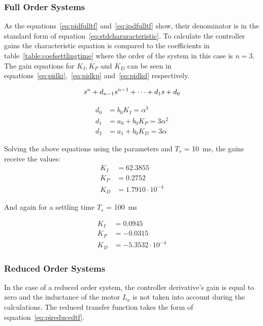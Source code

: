 \subsubsection{Full Order Systems}

As the equations~\ref{eq:pidfulltf} and~\ref{eq:ipdfulltf} show, their denominator is in the standard form of equation~\ref{eq:stdchararacteristic}. To calculate the controller gains the characteristic equation is compared to the coefficients in table~\ref{table:coefsettlingtime} where the order of the system in this case is $n=3$. The gain equations for $K_I, K_P$ and $K_D$ can be seen in equations~\ref{eq:pidki},~\ref{eq:pidkp} and~\ref{eq:pidkd} respectively. 


\begin{equation}
\centering
\label{eq:stdchararacteristic}
s^n + d_{n-1}s^{n-1} + \cdots + d_1 s + d_0 
\end{equation}

\begin{align}
\label{eq:pidki}
d_0 &= b_0 K_I = \alpha^3
\\
\label{eq:pidkp}
d_1 &= a_0 + b_0 K_P = 3\alpha^2
\\
\label{eq:pidkd}
d_2 &= a_1 + b_0 K_D = 3\alpha
\end{align}

Solving the above equations using the parameters and $T_s$ = 10~ms, the gains receive the values:
\begin{align*}
K_I &= 62.3855
\\
K_P &= 0.2752
\\
K_D &= 1.7910\cdot10^{-4}
\end{align*}

And again for a settling time $T_s$ = 100~ms

\begin{align*}
K_I &= 0.0945
\\
K_P &= -0.0315
\\
K_D &= -5.3532\cdot10^{-4}
\end{align*}


\subsubsection{Reduced Order Systems}

In the case of a reduced order system, the controller derivative's gain is equal to zero and the inductance of the motor $L_a$ is not taken into account during the calculations. The reduced transfer function takes the form of equation~\ref{eq:pireducedtf}.

